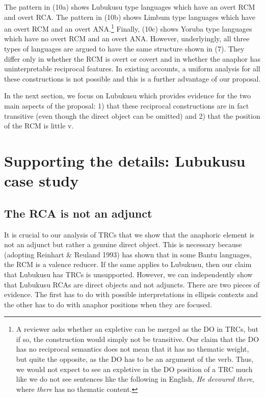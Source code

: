 \documentclass[output=paper]{langsci/langscibook}
\begin{document}
The pattern in (10a) shows Lubukusu type languages which have an overt RCM and overt RCA. The pattern in (10b) shows Limbum type languages which have an overt RCM and an overt ANA.\footnote{ A reviewer asks whether an expletive can be merged as the DO in TRCs, but if so, the construction would simply not be transitive. Our claim that the DO has no reciprocal semantics does not mean that it has no thematic weight, but quite the opposite, as the DO has to be an argument of the verb. Thus, we would not expect to see an expletive in the DO position of a TRC much like we do not see sentences like the following in English, \textit{He devoured there}, where \textit{there} has no thematic content.}   Finally, (10c) shows Yoruba type languages which have no overt RCM and an overt ANA. However, underlyingly, all three types of languages are argued to have the same structure shown in (7). They differ only in whether the RCM is overt or covert and in whether the anaphor has uninterpretable reciprocal features.  In existing accounts, a uniform analysis for all these constructions is not possible and this is a further advantage of our proposal. 

  In the next section, we focus on Lubukusu which provides evidence for the two main aspects of the proposal: 1) that these reciprocal constructions are in fact transitive (even though the direct object can be omitted) and 2) that the position of the RCM is little v.

\section{Supporting the details: Lubukusu case study}
\subsection{The RCA is not an adjunct}

  It is crucial to our analysis of TRCs that we show that the anaphoric element is not an adjunct but rather a genuine direct object. This is necessary because \citet{Mchombo1994} (adopting Reinhart \& Reuland 1993) has shown that in some Bantu languages, the RCM is a valence reducer. If the same applies to Lubukusu, then our claim that Lubukusu has TRCs is unsupported. However, we can independently show that Lubukusu RCAs are direct objects and not adjuncts. There are two pieces of evidence. The first has to do with possible interpretations in ellipsis contexts and the other has to do with anaphor positions when they are focused.
\end{document}
